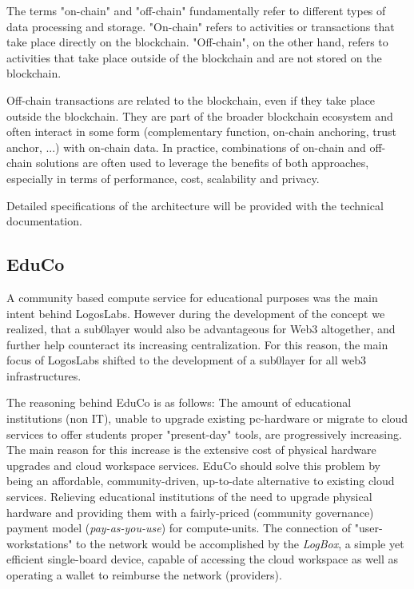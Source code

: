 \documentclass[]{article}
\begin{document}
The terms "on-chain" and "off-chain" fundamentally refer to different types of data processing and storage.
"On-chain" refers to activities or transactions that take place directly on the blockchain.
"Off-chain", on the other hand, refers to activities that take place outside of the blockchain and are not stored on the blockchain.
 
Off-chain transactions are related to the blockchain, even if they take place outside the blockchain. 
They are part of the broader blockchain ecosystem and often interact in some form (complementary function, on-chain anchoring, trust anchor, ...) with on-chain data.
In practice, combinations of on-chain and off-chain solutions are often used to leverage the benefits of both approaches, especially in terms of performance, cost, scalability and privacy.

Detailed specifications of the architecture will be provided with the technical documentation.

\subsection{EduCo}
A community based compute service for educational purposes was the main intent behind LogosLabs. 
However during the development of the concept we realized, that a sub0layer would also be advantageous for Web3 altogether, and further help counteract its increasing centralization.
For this reason, the main focus of LogosLabs shifted to the development of a sub0layer for all web3 infrastructures.

The reasoning behind EduCo is as follows: The amount of educational institutions (non IT), unable to upgrade existing pc-hardware or migrate to cloud services to offer students proper "present-day" tools, are progressively increasing.
The main reason for this increase is the extensive cost of physical hardware upgrades and cloud workspace services.
EduCo should solve this problem by being an affordable, community-driven, up-to-date alternative to existing cloud services. 
Relieving educational institutions of the need to upgrade physical hardware and providing them with a fairly-priced (community governance) payment model (\textit{pay-as-you-use}) \cite{WikipediaDoc-payu} for compute-units.
The connection of "user-workstations" to the network would be accomplished by the \textit{LogBox}, a simple yet efficient single-board device, capable of accessing the cloud workspace as well as operating a wallet to reimburse the network (providers).
\end{document}
